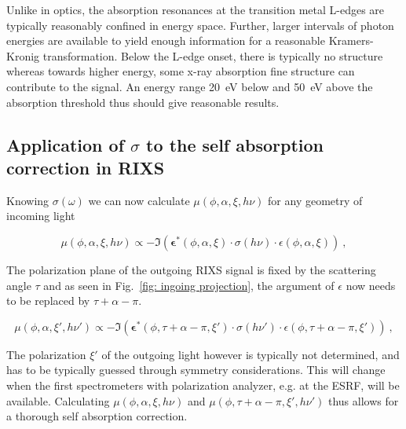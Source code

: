 \documentclass[twocolumn,prb,twocolumn,amsmath,superscriptaddress,nofootinbib,amssymb]{revtex4-1}
\newcommand{\vect}[1]{\boldsymbol{#1}}
\begin{document}
\begin{widetext}
Unlike in optics, the absorption resonances at the transition metal L-edges are typically reasonably confined in energy space. Further, larger intervals of photon energies are available to yield enough information for a reasonable Kramers-Kronig transformation. Below the L-edge onset, there is typically no structure whereas towards higher energy, some x-ray absorption fine structure can contribute to the signal. An energy range 20~eV below and 50~eV above the absorption threshold thus should give reasonable results.

\subsection{Application of $\sigma$ to the self absorption correction in RIXS }

Knowing $\sigma(\omega)$ we can now calculate $\mu(\phi,\alpha,\xi,h\nu)$ for any geometry of incoming light

\begin{equation}
\mu(\phi,\alpha,\xi,h\nu)\propto-\Im\left(\vect{\epsilon}^*(\phi,\alpha,\xi)\cdot\sigma(h\nu)\cdot\epsilon(\phi,\alpha,\xi)\right)~,
\end{equation}

The polarization plane of the outgoing RIXS signal is fixed by the scattering angle $\tau$ and as seen in Fig.~\ref{fig: ingoing projection}, the argument of $\epsilon$ now needs to be replaced by $\tau+\alpha-\pi$.

\begin{equation}
\mu(\phi,\alpha,\xi',h\nu')\propto-\Im\left(\vect{\epsilon}^*(\phi,\tau+\alpha-\pi,\xi')\cdot\sigma(h\nu')\cdot\epsilon(\phi,\tau+\alpha-\pi,\xi')\right)~,
\end{equation}

The polarization $\xi'$ of the outgoing light however is typically not determined, and has to be typically guessed through symmetry considerations. This will change when the first spectrometers with polarization analyzer, e.g. at the ESRF, will be available. Calculating $\mu(\phi,\alpha,\xi,h\nu)$ and $\mu(\phi,\tau+\alpha-\pi,\xi',h\nu')$ thus allows for a thorough self absorption correction.



\end{widetext}
\end{document}
